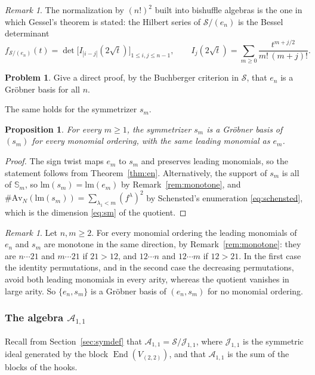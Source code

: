 \documentclass[11pt]{amsart}
\newtheorem{proposition}[theorem]{Proposition}
\theoremstyle{definition}
\newtheorem{problem}[theorem]{Problem}
\theoremstyle{remark}
\newtheorem{remark}[theorem]{Remark}
\newcommand{\bS}{\mathbb{S}}
\newcommand{\lm}{\mathrm{lm}}
\newcommand{\cA}{\mathscr{A}}
\newcommand{\cJ}{\mathscr{J}}
\newcommand{\cS}{\mathscr{S}}
\newcommand{\Av}{\mathrm{Av}}
\newcommand{\End}{\operatorname{End}}
\begin{document}
\begin{remark}\label{rem:gessel}
The normalization by $(n!)^2$ built into bishuffle algebras is the one in which Gessel's theorem \cite{Gessel} is stated: the Hilbert series of $\cS/(e_n)$ is the Bessel determinant
\[
f_{\cS/(e_n)}(t)=\det\bigl[I_{|i-j|}(2\sqrt t)\bigr]_{1\le i,j\le n-1},\qquad I_j(2\sqrt t)=\sum_{m\ge0}\frac{t^{m+j/2}}{m!\,(m+j)!}.
\]
\end{remark}

\begin{problem}
Give a direct proof, by the Buchberger criterion in $\cS$, that $e_n$ is a Gr\"obner basis for all $n$.
\end{problem}

The same holds for the symmetrizer $s_m$.

\begin{proposition}\label{prop:sm}
For every $m\ge1$, the symmetrizer $s_m$ is a Gr\"obner basis of $(s_m)$ for every monomial ordering, with the same leading monomial as $e_m$.
\end{proposition}

\begin{proof}
The sign twist maps $e_m$ to $s_m$ and preserves leading monomials, so the statement follows from Theorem~\ref{thm:en}. Alternatively, the support of $s_m$ is all of $\bS_m$, so $\lm(s_m)=\lm(e_m)$ by Remark~\ref{rem:monotone}, and $\#\Av_N(\lm(s_m))=\sum_{\lambda_1<m}(f^\lambda)^2$ by Schensted's enumeration \eqref{eq:schensted}, which is the dimension \eqref{eq:sm} of the quotient.
\end{proof}

\begin{remark}\label{rem:ensm-notGB}
Let $n,m\ge2$. For every monomial ordering the leading monomials of $e_n$ and $s_m$ are monotone in the same direction, by Remark~\ref{rem:monotone}: they are $n\cdots21$ and $m\cdots21$ if $21>12$, and $12\cdots n$ and $12\cdots m$ if $12>21$. In the first case the identity permutations, and in the second case the decreasing permutations, avoid both leading monomials in every arity, whereas the quotient vanishes in large arity. So $\{e_n,s_m\}$ is a Gr\"obner basis of $(e_n,s_m)$ for no monomial ordering.
\end{remark}

\subsubsection{The algebra $\cA_{1,1}$}
Recall from Section~\ref{sec:symdef} that $\cA_{1,1}=\cS/\cJ_{1,1}$, where $\cJ_{1,1}$ is the symmetric ideal generated by the block $\End(V_{(2,2)})$, and that $\cA_{1,1}$ is the sum of the blocks of the hooks.
\end{document}
